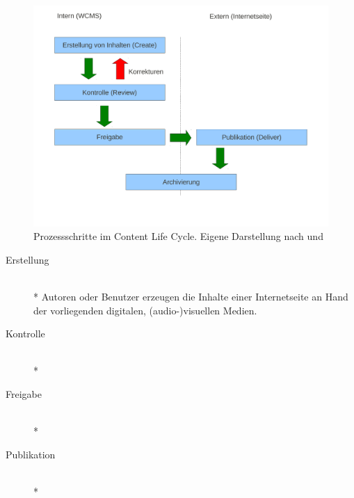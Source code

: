 \begin{figure}[!ht]
\begin{center}
\includegraphics[scale=0.5]{images/grundlagen/lifecycle.pdf}
\caption[Prozessschritte im Content Life Cycle]{Prozessschritte im Content Life Cycle. Eigene Darstellung nach \citep[S. 81]{rockley} und \citep[S. 10]{RitterSwot}}
\label{rackmiddlewares}
\end{center}
\end{figure}


\begin{description}
\item[Erstellung]\mbox{~}\\*
Autoren oder Benutzer erzeugen die Inhalte einer Internetseite an Hand der vorliegenden digitalen, (audio-)visuellen Medien.
\item[Kontrolle]\mbox{~}\\*

\item[Freigabe]\mbox{~}\\*

\item[Publikation]\mbox{~}\\*

\end{description}



\newpage


